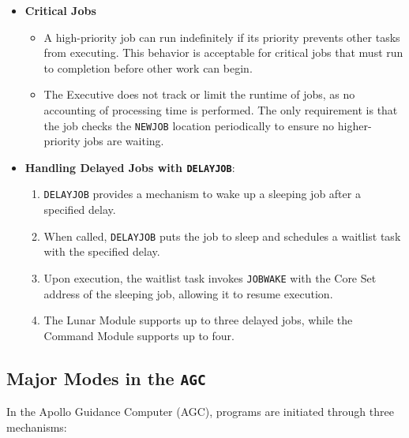 \documentclass[refcap, oxford]{ahsan}
\begin{document}
\begin{itemize}
    \item \textbf{Critical Jobs}
        \begin{itemize}
            \item A high-priority job can run indefinitely if its priority prevents
                other tasks from executing. This behavior is acceptable for critical
                jobs that must run to completion before other work can begin.
            \item The Executive does not track or limit the runtime of jobs, as no
                accounting of processing time is performed. The only requirement is
                that the job checks the \texttt{NEWJOB} location periodically to ensure
                no higher-priority jobs are waiting.
        \end{itemize}
    \item \textbf{Handling Delayed Jobs with \texttt{DELAYJOB}}:
        \begin{enumerate}
            \item \texttt{DELAYJOB} provides a mechanism to wake up a sleeping job
                after a specified delay.
            \item When called, \texttt{DELAYJOB} puts the job to sleep and schedules a
                waitlist task with the specified delay.
            \item Upon execution, the waitlist task invokes \texttt{JOBWAKE} with the
                Core Set address of the sleeping job, allowing it to resume execution.
            \item The Lunar Module supports up to three delayed jobs, while the Command
                Module supports up to four.
        \end{enumerate}
\end{itemize}


\subsection{Major Modes in the \texttt{AGC}}

In the Apollo Guidance Computer (AGC), programs are initiated through three mechanisms:
\end{document}
